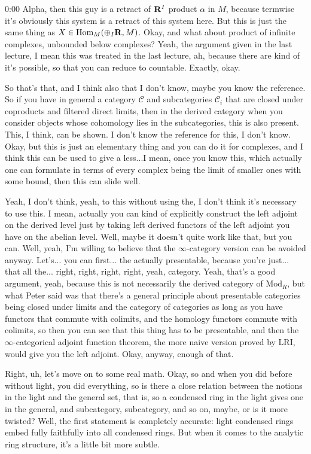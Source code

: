 \begin{unfinished}{0:00}
Alpha, then this guy is a retract of $\mathbf R^I$ product $\alpha$ in $M$, because termwise it's obviously this system is a retract of this system here. But this is just the same thing as $X \in \text{Hom}_M(\oplus_I \mathbf R, M)$. Okay, and what about product of infinite complexes, unbounded below complexes? Yeah, the argument given in the last lecture, I mean this was treated in the last lecture, ah, because there are kind of it's possible, so that you can reduce to countable. Exactly, okay. 

So that's that, and I think also that I don't know, maybe you know the reference. So if you have in general a category $\mathcal{C}$ and subcategories $\mathcal{C}_i$ that are closed under coproducts and filtered direct limits, then in the derived category when you consider objects whose cohomology lies in the subcategories, this is also present. This, I think, can be shown. I don't know the reference for this, I don't know. Okay, but this is just an elementary thing and you can do it for complexes, and I think this can be used to give a less...I mean, once you know this, which actually one can formulate in terms of every complex being the limit of smaller ones with some bound, then this can slide well.

Yeah, I don't think, yeah, to this without using the, I don't think it's necessary to use this. I mean, actually you can kind of explicitly construct the left adjoint on the derived level just by taking left derived functors of the left adjoint you have on the abelian level. Well, maybe it doesn't quite work like that, but you can. Well, yeah, I'm willing to believe that the $\infty$-category version can be avoided anyway. Let's... you can first... the actually presentable, because you're just... that all the... right, right, right, right, yeah, category. Yeah, that's a good argument, yeah, because this is not necessarily the derived category of $\text{Mod}_R$, but what Peter said was that there's a general principle about presentable categories being closed under limits and the category of categories as long as you have functors that commute with colimits, and the homology functors commute with colimits, so then you can see that this thing has to be presentable, and then the $\infty$-categorical adjoint function theorem, the more naive version proved by LRI, would give you the left adjoint. Okay, anyway, enough of that. 

Right, uh, let's move on to some real math. Okay, so and when you did before without light, you did everything, so is there a close relation between the notions in the light and the general set, that is, so a condensed ring in the light gives one in the general, and subcategory, subcategory, and so on, maybe, or is it more twisted? Well, the first statement is completely accurate: light condensed rings embed fully faithfully into all condensed rings. But when it comes to the analytic ring structure, it's a little bit more subtle.


\end{unfinished}
